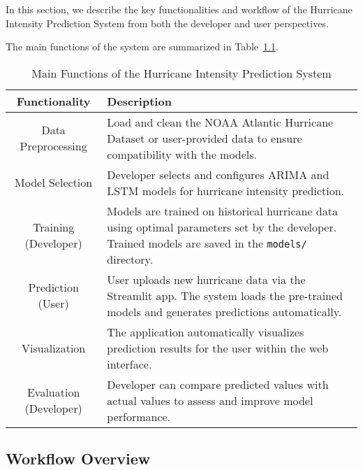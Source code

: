 %
%

\chapter{}

In this section, we describe the key functionalities and workflow of the Hurricane Intensity Prediction System from both the developer and user perspectives.

The main functions of the system are summarized in Table~\ref{tab:main_functions}.

\begin{table}[h]
	\centering
	\begin{tabular}{|c|p{8cm}|}
		\hline
		\textbf{Functionality} & \textbf{Description} \\
		\hline
		Data Preprocessing & Load and clean the NOAA Atlantic Hurricane Dataset or user-provided data to ensure compatibility with the models. \\
		\hline
		Model Selection & Developer selects and configures ARIMA and LSTM models for hurricane intensity prediction. \\
		\hline
		Training (Developer) & Models are trained on historical hurricane data using optimal parameters set by the developer. Trained models are saved in the \texttt{models/} directory. \\
		\hline
		Prediction (User) & User uploads new hurricane data via the Streamlit app. The system loads the pre-trained models and generates predictions automatically. \\
		\hline
		Visualization & The application automatically visualizes prediction results for the user within the web interface. \\
		\hline
		Evaluation (Developer) & Developer can compare predicted values with actual values to assess and improve model performance. \\
		\hline
	\end{tabular}
	\caption{Main Functions of the Hurricane Intensity Prediction System}
	\label{tab:main_functions}
\end{table}

\section*{Workflow Overview}

